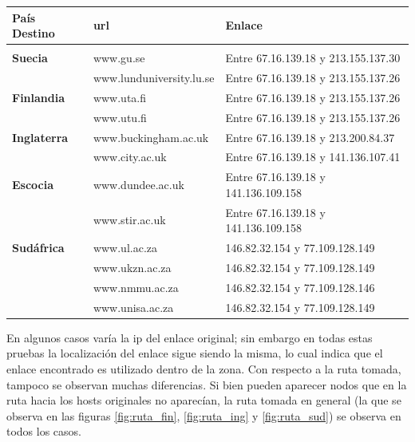 \begin{center}
\begin{tabular}{l l l}
  \textbf{País Destino} & \textbf{url} & \textbf{Enlace} \\
  \hline \\
 \textbf{Suecia} & www.gu.se & Entre 67.16.139.18 y 213.155.137.30\\
  & www.lunduniversity.lu.se & Entre 67.16.139.18 y 213.155.137.26\\
  \textbf{Finlandia} & www.uta.fi & Entre 67.16.139.18 y 213.155.137.26\\
    & www.utu.fi & Entre 67.16.139.18 y 213.155.137.26\\
   \textbf{Inglaterra} & www.buckingham.ac.uk & Entre 67.16.139.18 y 213.200.84.37\\
    & www.city.ac.uk & Entre 67.16.139.18 y 141.136.107.41\\
    \textbf{Escocia} & www.dundee.ac.uk & Entre 67.16.139.18 y 141.136.109.158\\
     & www.stir.ac.uk & Entre 67.16.139.18 y 141.136.109.158\\
     \textbf{Sudáfrica} & www.ul.ac.za & 146.82.32.154 y 77.109.128.149\\
      & www.ukzn.ac.za & 146.82.32.154 y 77.109.128.149\\
       & www.nmmu.ac.za & 146.82.32.154 y 77.109.128.146\\
        & www.unisa.ac.za & 146.82.32.154 y 77.109.128.149
 \end{tabular}
 \end{center}
 
 
 En algunos casos varía la ip del enlace original; sin embargo en todas estas pruebas la localización del enlace sigue siendo la misma, lo cual indica que el enlace encontrado es utilizado dentro de la zona. Con respecto a la ruta tomada, tampoco se observan muchas diferencias. Si bien pueden aparecer nodos que en la ruta hacia los hosts originales no aparecían, la ruta tomada en general (la que se observa en las figuras \ref{fig:ruta_fin}, \ref{fig:ruta_ing} y \ref{fig:ruta_sud}) se observa en todos los casos. 

